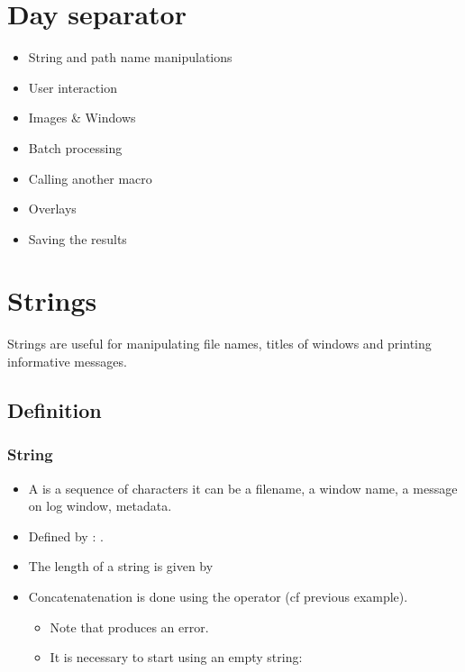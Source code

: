 \section{Day separator}
\begin{frame}[fragile]
\end{frame}

\begin{frame}[fragile]
	\begin{itemize}
		\item String and path name manipulations
		\item User interaction
		\item Images \& Windows
		\item Batch processing
		\item Calling another macro
		\item Overlays
		\item Saving the results
	\end{itemize}
\end{frame}

\section{Strings}

Strings are useful for manipulating file names, titles of windows and printing
informative messages.

\subsection{Definition}
\begin{frame}[fragile]
  \frametitle<presentation>{String}
  \begin{itemize}
  \item A  is a sequence of characters it can be a
    filename, a window name, a message on log window, metadata.
  \item Defined by : .
  \item The length of a string is given by 
  \item Concatenatenation is done using the operator \code{+} (cf previous example).
    \begin{itemize}
    \item Note that  produces an error.
    \item It is necessary to start using an empty string: 
    \end{itemize}
  \end{itemize}
\end{frame}

